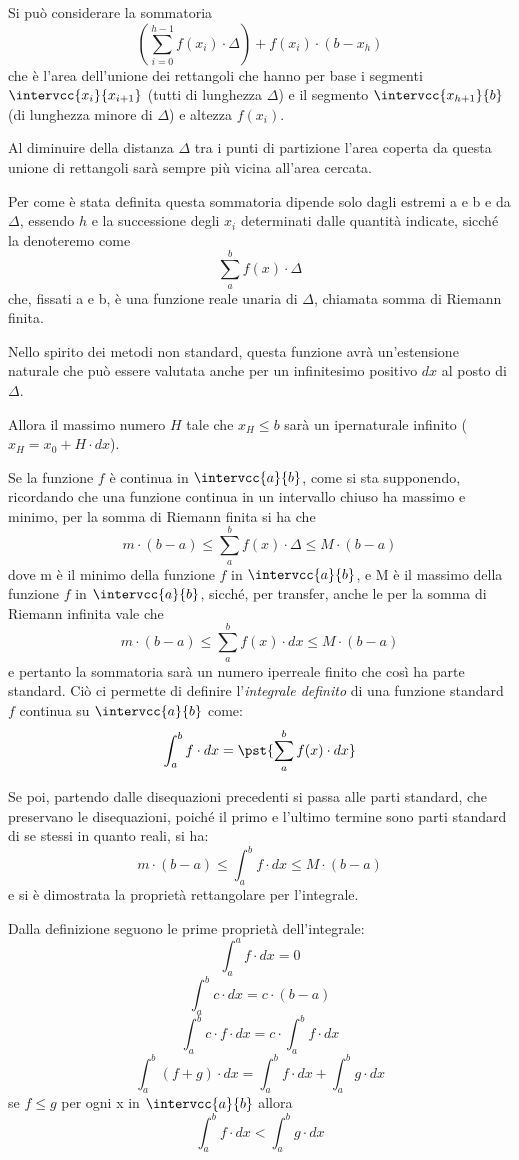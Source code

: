 Si può considerare la sommatoria
\[\left(\sum_{i=0}^{h-1} f(x_i)\cdot\Delta \right)+f(x_i)\cdot(b-x_h)\] 
che è l'area dell'unione dei rettangoli che 
hanno per base i segmenti \(\intervcc{x_i}{x_{i+1}}\) 
(tutti di lunghezza \(\Delta\)) e 
il segmento 
\(\intervcc{x_{h+1}}{b}\) (di lunghezza minore di \(\Delta\)) e altezza 
\(f(x_i)\). 

Al diminuire della distanza \(\Delta\) tra i punti di partizione 
l'area coperta da questa unione di rettangoli sarà sempre più vicina all'area 
cercata.

Per come è stata definita questa sommatoria dipende solo dagli estremi a e b 
e da \(\Delta\), essendo $h$ e la successione degli \(x_i\) determinati dalle 
quantità indicate, sicché la denoteremo come 
\[\sum_a^b f(x) \cdot\Delta\] 
che, fissati a e b, è una 
funzione reale unaria di \(\Delta\), chiamata somma di Riemann finita. 

Nello spirito dei metodi non standard, questa funzione avrà un'estensione 
naturale che può essere valutata anche per un infinitesimo positivo \(dx\) 
al posto di \(\Delta\).

Allora il massimo numero \(H\) tale che \(x_H \le b\) sarà un ipernaturale 
infinito (\(x_H = x_0 + H \cdot dx\)).


Se la funzione \(f\) è continua in \(\intervcc{a}{b}\), come si sta 
supponendo, 
ricordando che una funzione continua in un intervallo chiuso ha massimo e 
minimo, per la somma di Riemann finita si ha che 
\[m\cdot(b - a) \le \sum_a^b f(x) \cdot\Delta \le M\cdot(b - a)\] 
dove m è il minimo della funzione \(f\) in \(\intervcc{a}{b}\), e 
M è il massimo della funzione \(f\) in \(\intervcc{a}{b}\), sicché, per 
transfer, 
anche le per 
la somma di Riemann infinita vale che 
\[m \cdot (b - a) \le  \sum_a^b f(x) \cdot dx  \le M\cdot(b - a)\]
e pertanto la sommatoria sarà un numero iperreale finito che così ha parte 
standard. 
Ciò ci permette di definire l'\emph{integrale definito} di una funzione 
standard \(f\) continua su \(\intervcc{a}{b}\) come:
\[\int_a^b f \cdot dx = \pst{\sum_a^b f(x) \cdot dx}\]

Se poi, 
partendo dalle disequazioni precedenti si passa alle parti standard, che 
preservano le disequazioni, poiché il primo e l'ultimo termine sono parti 
standard di se stessi in quanto reali, si ha: 
\[m \cdot(b - a) \le  \int_a^b f \cdot dx  \le M\cdot(b - a)\] 
e si è dimostrata la proprietà rettangolare per l'integrale.

Dalla definizione seguono le prime proprietà dell'integrale:
\[\int_a^a f \cdot dx=0\] 
\[\int_a^b c \cdot dx = c \cdot (b-a)\] 
\[\int_a^b c \cdot f \cdot dx = c\cdot\int_a^b f \cdot dx\] 
\[\int_a^b (f+g)\cdot dx = 
  \int_a^b f \cdot dx + \int_a^b g\cdot dx\]
se \(f \le g\) per ogni x in \(\intervcc{a}{b}\) allora 
\[\int_a^b f \cdot dx < \int_a^b g\cdot dx\]

